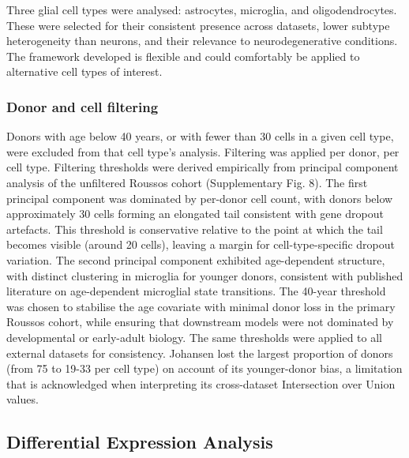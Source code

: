 \documentclass[
]{article}
\begin{document}
Three glial cell types were analysed: astrocytes, microglia, and
oligodendrocytes. These were selected for their consistent presence
across datasets, lower subtype heterogeneity than neurons, and their
relevance to neurodegenerative conditions. The framework developed is
flexible and could comfortably be applied to alternative cell types of
interest.

\subsubsection{Donor and cell filtering}\label{donor-and-cell-filtering}

Donors with age below 40 years, or with fewer than 30 cells in a given
cell type, were excluded from that cell type's analysis. Filtering was
applied per donor, per cell type. Filtering thresholds were derived
empirically from principal component analysis of the unfiltered Roussos
cohort (Supplementary Fig. 8). The first principal component was
dominated by per-donor cell count, with donors below approximately 30
cells forming an elongated tail consistent with gene dropout artefacts.
This threshold is conservative relative to the point at which the tail
becomes visible (around 20 cells), leaving a margin for
cell-type-specific dropout variation. The second principal component
exhibited age-dependent structure, with distinct clustering in microglia
for younger donors, consistent with published literature on
age-dependent microglial state transitions. The 40-year threshold was
chosen to stabilise the age covariate with minimal donor loss in the
primary Roussos cohort, while ensuring that downstream models were not
dominated by developmental or early-adult biology. The same thresholds
were applied to all external datasets for consistency. Johansen lost the
largest proportion of donors (from 75 to 19-33 per cell type) on account
of its younger-donor bias, a limitation that is acknowledged when
interpreting its cross-dataset Intersection over Union values.

\subsection{Differential Expression
Analysis}\label{differential-expression-analysis}
\end{document}
